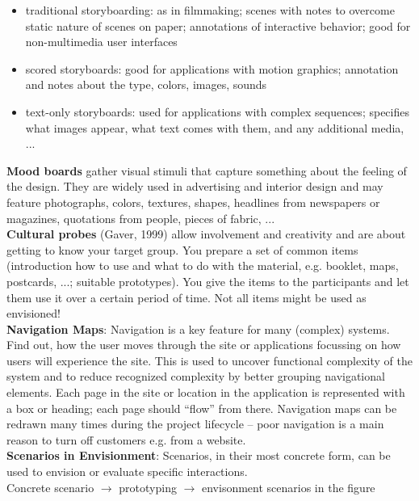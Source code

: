 \begin{itemize}
\item traditional storyboarding: as in filmmaking; scenes with notes to overcome static nature of scenes on paper; annotations of interactive behavior; good for non-multimedia user interfaces
\item scored storyboards: good for applications with motion graphics; annotation and notes about the type, colors, images, sounds
\item text-only storyboards: used for applications with complex sequences; specifies what images appear, what text comes with them, and any additional media, ...
\end{itemize}
\textbf{Mood boards} gather visual stimuli that capture something about the feeling of the design. They are widely used in advertising and interior design and may feature photographs, colors, textures, shapes, headlines from newspapers or magazines, quotations from people, pieces of fabric, ...\\
\textbf{Cultural probes} (Gaver, 1999) allow involvement and creativity and are about getting to know your target group. You prepare a set of common items (introduction how to use and what to do with the material, e.g. booklet, maps, postcards, ...; suitable prototypes). You give the items to the participants and let them use it over a certain period of time. Not all items might be used as envisioned!\\
\textbf{Navigation Maps}: Navigation is a key feature for many (complex) systems. Find out, how the user moves through the site or applications focussing on how users will experience the site. This is used to uncover functional complexity of the system and to reduce recognized complexity by better grouping navigational elements. Each page in the site or location in the application is represented with a box or heading; each page should ``flow'' from there. Navigation maps can be redrawn many times during the project lifecycle – poor navigation is a main reason to turn off customers e.g. from a website.\\
\textbf{Scenarios in Envisionment}: Scenarios, in their most concrete form, can be used to envision or evaluate specific interactions.\\
Concrete scenario $\rightarrow$  prototyping $\rightarrow$  envisonment scenarios in the figure\\
